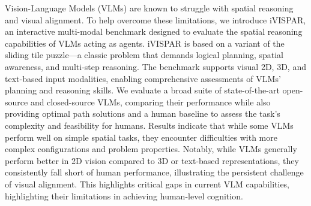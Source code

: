 Vision-Language Models (VLMs) are known to struggle with spatial reasoning and visual alignment. To help overcome these limitations, we introduce iVISPAR, an interactive multi-modal benchmark designed to evaluate the spatial reasoning capabilities of VLMs acting as agents. \mbox{iVISPAR} is based on a variant of the sliding tile puzzle—a classic problem that demands logical planning, spatial awareness, and multi-step reasoning. The benchmark supports visual 2D, 3D, and text-based input modalities, enabling comprehensive assessments of VLMs' planning and reasoning skills. We evaluate a broad suite of state-of-the-art open-source and closed-source VLMs, comparing their performance while also providing optimal path solutions and a human baseline to assess the task's complexity and feasibility for humans. Results indicate that while some VLMs perform well on simple spatial tasks, they encounter difficulties with more complex configurations and problem properties. Notably, while VLMs generally perform better in 2D vision compared to 3D or text-based representations, they consistently fall short of human performance, illustrating the persistent challenge of visual alignment. This highlights critical gaps in current VLM capabilities, highlighting their limitations in achieving human-level cognition.